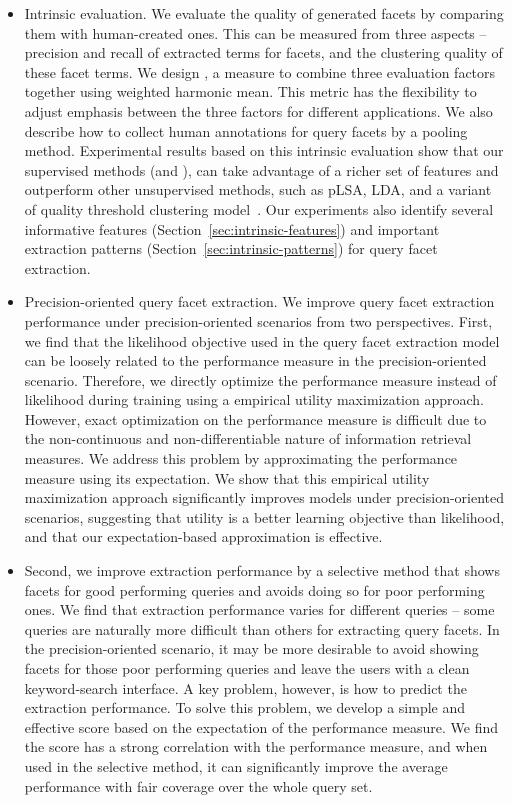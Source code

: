 \begin{itemize}
\item Intrinsic evaluation. We evaluate the quality of generated facets by comparing them with human-created ones. This can be measured from three aspects -- precision and recall of extracted terms for facets, and the clustering quality of these facet terms. We design \PRF, a measure to combine three evaluation factors together using weighted harmonic mean. This metric has the flexibility to adjust emphasis between the three factors for different applications. We also describe how to collect human annotations for query facets by a pooling method. Experimental results based on this intrinsic evaluation show that our supervised methods (\QFI and \QFJ), can take advantage of a richer set of features and outperform other unsupervised methods, such as pLSA, LDA, and a variant of quality threshold clustering model~\cite{dou2011finding}. Our experiments also identify several informative features (Section~\ref{sec:intrinsic-features}) and important extraction patterns (Section~\ref{sec:intrinsic-patterns}) for query facet extraction.

\item Precision-oriented query facet extraction. We improve query facet extraction performance under precision-oriented scenarios from two perspectives. First, we find that the likelihood objective used in the query facet extraction model can be loosely related to the performance measure in the precision-oriented scenario. Therefore, we directly optimize the performance measure instead of likelihood during training using a empirical utility maximization approach. However, exact optimization on the performance measure is difficult due to the non-continuous and non-differentiable nature of information retrieval measures. We address this problem by approximating the performance measure using its expectation. We show that this empirical utility maximization approach significantly improves models under precision-oriented scenarios, suggesting that utility is a better learning objective than likelihood, and that our expectation-based approximation is effective.  


\item Second, we improve extraction performance by a selective method that shows facets for good performing queries and avoids doing so for poor performing ones. We find that extraction performance varies for different queries -- some queries are naturally more difficult than others for extracting query facets. In the precision-oriented scenario, it may be more desirable to avoid showing facets for those poor performing queries and leave the users with a clean keyword-search interface. A key problem, however, is how to predict the extraction performance. To solve this problem, we develop a simple and effective score based on the expectation of the performance measure. We find the score has a strong correlation with the performance measure, and when used in the selective method, it can significantly improve the average performance with fair coverage over the whole query set.


\end{itemize}
